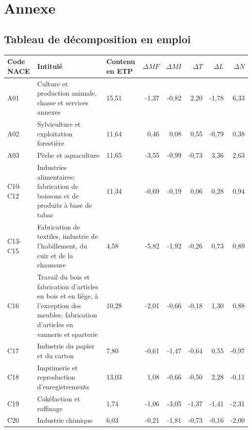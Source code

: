 \section*{Annexe}


\subsection{Tableau de décomposition en emploi}
\label{app:tableau_ce}

\begin{small}
\begin{longtable}{m{1.3cm}m{5.7cm}m{1cm}rrrrr} %
	\hline
	Code NACE & Intitulé & Contenu en ETP & $\Delta MF$ & $\Delta MI$ & $\Delta T$ & $\Delta L$ & $\Delta N$ \\ 
	\hline
	A01 & Culture et production animale, chasse et services annexes & 15,51 & -1,37 & -0,82 & 2,20 & -1,78 & 6,33 \\ 
	\hline
	A02 & Sylviculture et exploitation forestière & 11,64 & 0,46 & 0,08 & 0,55 & -0,79 & 0,38 \\ 
	\hline
	A03 & Pêche et aquaculture & 11,65 & -3,55 & -0,99 & -0,73 & 3,36 & 2,63 \\ 
	\hline
	C10-C12 & Industries alimentaires; fabrication de boissons et de produits à base de tabac & 11,34 & -0,69 & -0,19 & 0,06 & 0,28 & 0,94 \\ 
	\hline
	C13-C15 & Fabrication de textiles, industrie de l'habillement, du cuir et de la chaussure & 4,58 & -5,82 & -1,92 & -0,26 & 0,73 & 0,89 \\ 
	\hline
	C16 & Travail du bois et fabrication d'articles en bois et en liège, à l'exception des meubles; fabrication d'articles en vannerie et sparterie & 10,28 & -2,01 & -0,66 & -0,18 & 1,30 & 0,88 \\ 
	\hline
	C17 & Industrie du papier et du carton & 7,80 & -0,61 & -1,47 & -0,64 & 0,55 & -0,97 \\ 
	\hline
	C18 & Imprimerie et reproduction d'enregistrements & 13,03 & 1,08 & -0,66 & -0,50 & 2,28 & -0,11 \\ 
	\hline
	C19 & Cokéfaction et raffinage & 1,74 & -1,06 & -3,05 & -1,37 & -1,41 & -2,31 \\ 
	\hline
	C20 & Industrie chimique & 6,03 & -0,21 & -1,81 & -0,73 & -0,16 & -2,00 \\ 

\end{longtable}
\end{small}
